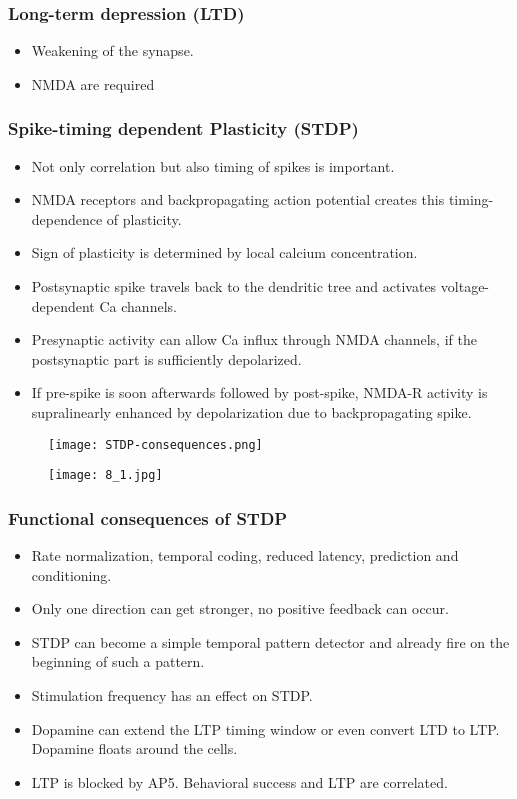 \documentclass[main]{subfiles}
\begin{document}
\subsubsection{Long-term depression (LTD)}
\begin{itemize}[noitemsep,nolistsep]
	\item Weakening of the synapse.
	\item NMDA are required
\end{itemize}

\subsubsection{Spike-timing dependent Plasticity (STDP)}
\begin{itemize}[noitemsep,nolistsep]
	\item Not only correlation but also timing of spikes is important.
	\item NMDA receptors and backpropagating action potential creates this timing-dependence of plasticity.
	\item Sign of plasticity is determined by local calcium concentration.
	\item Postsynaptic spike travels back to the dendritic tree and activates voltage-dependent Ca channels.
	\item Presynaptic activity can allow Ca influx through NMDA channels, if the postsynaptic part is sufficiently depolarized.
	\item If pre-spike is soon afterwards followed by post-spike, NMDA-R activity is supralinearly enhanced by depolarization due to backpropagating spike.
\end{itemize}

\begin{figure}[H]
	\centering
	\texttt{[image: STDP-consequences.png]}
\end{figure}

\begin{figure}[H]
	\centering
	\texttt{[image: 8\_1.jpg]}
\end{figure} 

\subsubsection{Functional consequences of STDP}
\begin{itemize}[noitemsep,nolistsep]
	\item Rate normalization, temporal coding, reduced latency, prediction and conditioning.
	\item Only one direction can get stronger, no positive feedback can occur.
	\item STDP can become a simple temporal pattern detector and already fire on the beginning of such a pattern.
	\item Stimulation frequency has an effect on STDP.
	\item Dopamine can extend the LTP timing window or even convert LTD to LTP. Dopamine floats around the cells.
	\item LTP is blocked by AP5. Behavioral success and LTP are correlated.
\end{itemize}
\end{document}
